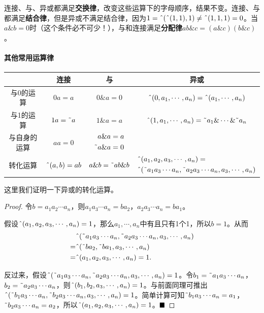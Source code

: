 连接、与、异或都满足\textbf{交换律}，改变这些运算下的字母顺序，结果不变。连接、与都满足\textbf{结合律}，但是异或不满足结合律，因为$1=\textrm{\^{}}(\textrm{\^{}}(1,1),1)\ne \textrm{\^{}}(1,1,1)=0$。当$a\&b=0$时（这个条件必不可少！），与和连接满足\textbf{分配律}$ab\&c=(a\&c)(b\&c)$。

\paragraph*{其他常用运算律}
\begin{center}
\begin{tabular}{|c|c|c|c|}
\hline
&连接&与&异或\\\hline
与0的运算&$0a=a$&$0\&a=0$&$\textrm{\^{}}(0,a_1,\cdots,a_n)=\textrm{\^{}}(a_1,\cdots,a_n)$\\\hline
与1的运算&$1a=\textrm{\~{}} a$&$1\&a=a$&$\textrm{\^{}}(1,a_1,\cdots,a_n)=\textrm{\~{}} a_1\&\cdots\&\textrm{\~{}} a_n$\\\hline
与自身的运算&$aa=0$&$\begin{aligned}a\& a&=a\\\textrm{\~{}} a\& a&=0\end{aligned}$&\\\hline
转化运算&$\textrm{\^{}}(a,b)=ab$&$a\&b=\textrm{\~{}} ab\&b$&$\begin{aligned}[]&\textrm{\^{}}(a_1,a_2,a_3,\cdots,a_n)=\\&\textrm{\^{}}(\textrm{\~{}} a_1a_3\cdots a_n,\textrm{\~{}} a_2a_3\cdots a_n,a_3,\cdots,a_n)\end{aligned}$\\\hline
\end{tabular}
\end{center}

这里我们证明一下异或的转化运算。
\begin{proof}
令$b=a_1a_2\cdots a_n$，则$a_1a_3\cdots a_n=ba_2$，$a_2a_3\cdots a_n=ba_1$。

假设$\textrm{\^{}}(a_1,a_2,a_3,\cdots,a_n)=1$，那么$a_1,\cdots,a_n$中有且只有1个1，所以$b=1$。从而
\[\begin{split}
&\textrm{\^{}}(\textrm{\~{}} a_1a_3\cdots a_n,\textrm{\~{}} a_2a_3\cdots a_n,a_3,\cdots,a_n)\\
=&\textrm{\^{}}(\textrm{\~{}}ba_2,\textrm{\~{}}ba_1,a_3,\cdots,a_n)\\
=&\textrm{\^{}}(a_1,a_2,a_3,\cdots,a_n)=1.
\end{split}\]

反过来，假设$\textrm{\^{}}(\textrm{\~{}} a_1a_3\cdots a_n,\textrm{\~{}} a_2a_3\cdots a_n,a_3,\cdots,a_n)=1$。令$b_1=\textrm{\~{}} a_1a_3\cdots a_n$，$b_2=\textrm{\~{}} a_2a_3\cdots a_n$，则$\textrm{\^{}}(b_1,b_2,a_3,\cdots,a_n)=1$。与前面同理可推出$\textrm{\^{}}(\textrm{\~{}} b_1a_3\cdots a_n,\textrm{\~{}} b_2a_3\cdots a_n,a_3,\cdots,a_n)=1$。简单计算可知$\textrm{\~{}} b_1a_3\cdots a_n=a_1$，$\textrm{\~{}} b_2a_3\cdots a_n=a_2$，所以$\textrm{\^{}}(a_1,a_2,a_3,\cdots,a_n)=1$。$\hfill\blacksquare$
\end{proof}

